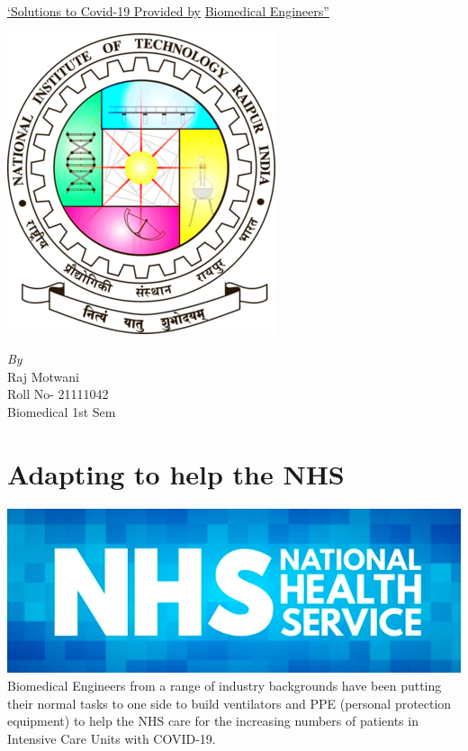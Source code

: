 \documentclass[12pt]{article}
\begin{document}
\begin{center}
\huge\underline{`Solutions to Covid-19 Provided by}
\huge\underline{ Biomedical Engineers''}
\end{center}
\begin{center}
 \includegraphics[scale=0.8]{nitlogo.png }
\end{center}
\vspace{1cm}
\begin{center}
   \emph{\large By}\\
\Large{Raj Motwani }\\
\large{Roll No- 21111042}\\
\large{Biomedical 1st Sem}\\
\end{center}
\clearpage
\section{Adapting to help the NHS}
\includegraphics[scale=0.4]{nhs.png}\\
Biomedical Engineers from a range of industry backgrounds have been putting their normal tasks to one side to build ventilators and PPE (personal protection equipment) to help the NHS care for the increasing numbers of patients in Intensive Care Units with COVID-19. 
\\
\end{document}
